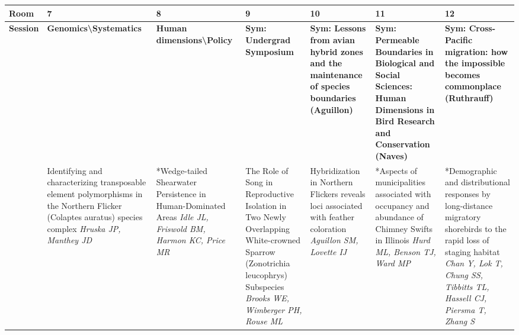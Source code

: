 \begin{tabular}{|x{0.75cm}|x{2.25cm}|x{2.25cm}|a{2.25cm}|a{2.25cm}|a{2.25cm}|a{2.25cm}|}\hline
Room & 7 & 8 & 9 & 10 & 11 & 12\\
\hline
\rule{0pt}{1em} \textbf{Session} &\footnotesize \textbf{Genomics\textbackslash Systematics} & \footnotesize \textbf{Human dimensions\textbackslash Policy} & \footnotesize \textbf{Sym: Undergrad Symposium} & \footnotesize \textbf{Sym: Lessons from avian hybrid zones and the maintenance of species boundaries (Aguillon)} & \footnotesize \textbf{Sym: Permeable Boundaries in Biological and Social Sciences: Human Dimensions in Bird Research and Conservation (Naves)} & \footnotesize \textbf{Sym: Cross-Pacific migration: how the impossible becomes commonplace (Ruthrauff)}\\
\hline
{}&Identifying and characterizing transposable element polymorphisms in the Northern Flicker (Colaptes auratus) species complex \newline \newline \textit{Hruska JP, Manthey JD} & *Wedge-tailed Shearwater Persistence in Human-Dominated Areas \newline \newline \textit{Idle JL, Friswold BM, Harmon KC, Price MR} & The Role of Song in Reproductive Isolation in Two Newly Overlapping White-crowned Sparrow (Zonotrichia leucophrys) Subspecies \newline \newline \textit{Brooks WE, Wimberger PH, Rouse ML} & Hybridization in Northern Flickers reveals loci associated with feather coloration \newline \newline \textit{Aguillon SM, Lovette IJ} & *Aspects of municipalities associated with occupancy and abundance of Chimney Swifts in Illinois \newline \newline \textit{Hurd ML, Benson TJ, Ward MP} & *Demographic and distributional responses by long-distance migratory shorebirds to the rapid loss of staging habitat \newline \newline \textit{Chan Y, Lok T, Chung SS, Tibbitts TL, Hassell CJ, Piersma T, Zhang S}\\
\hline

\end{tabular}
